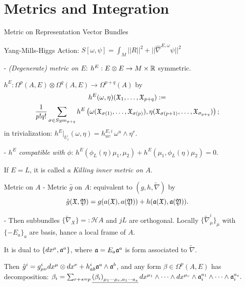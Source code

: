 \section{Metrics and Integration}

\begin{frame}{Metric on Representation Vector Bundles}
    
    Yang-Mills-Higgs Action: $ S[\omega, \psi]=\int_M ||R||^2 + ||\hat \nabla^{E, \omega} \psi||^2$
    
    - \emph{(Degenerate) metric on $E$}: $h^E: E \otimes E \to M \times \mathbb{R}$ symmetric.
    
    $h^E: \Omega^p(A, E) \otimes \Omega^q(A, E) \to \Omega^{p+q}(A)$ by
    \begin{multline*}
        h^E(\omega, \eta)(\mathfrak{X}_1, \dots, \mathfrak{X}_{p+q}) :=\\ \frac{1}{p!q!} \sum_{\sigma \in Sym_{p+q}} 
        h^E\left( \omega(\mathfrak{X}_{\sigma(1)}, \dots, \mathfrak{X}_{\sigma(p)}),  \eta(\mathfrak{X}_{\sigma(p+1)}, \dots, \mathfrak{X}_{\sigma_{p+q}}) \right);
    \end{multline*}
    in trivialization: $h^E|_{U_i}(\omega, \eta) = h^{E,i}_{uv}\,\omega^u \wedge \eta^v$.
    
    - \emph{$h^E$ compatible with $\phi$}: $h^E(\phi_L(\eta) \mu_1, \mu_2) + h^E(\mu_1, \phi_L(\eta)\mu_2) = 0$.
    
    If $E = L$, it is called \emph{a Killing inner metric on $A$}.
\end{frame}



\begin{frame}{Metric on $A$}
    - Metric $\hat g$ on $A$: equivalent to $(g, h, \tilde \nabla)$ by $$\hat g(\mathfrak{X}, \mathfrak{Y}) = g(a(\mathfrak{X}), a(\mathfrak{Y})) + h(\mathfrak{a}(\mathfrak{X}), \mathfrak{a}(\mathfrak{Y})).$$
    
    - Then subbundles $\{\tilde \nabla_X\} =: \mathcal H A$ and $jL$ are orthogonal. Locally $\{\tilde \nabla^i_{\mu}\}_\mu$ with $\{-E_a\}_a$ are basis, hance a local frame of $A$.
    
    It is dual to $\{dx^\mu, \mathfrak{a}^a\}$, where $\mathfrak{a} =  E_a \mathfrak{a}^a$ is form associated to $\tilde \nabla$.
    
    Then $\hat g^i = g^i_{\mu \nu} dx^\mu \otimes dx^\nu + h^i_{ab} \mathfrak{a}^a \wedge \mathfrak{a}^b$, and any form $\beta \in \Omega^p(A, E)$ has decomposition:
    $
    \beta_i = \sum_{r + s = p} \emph{\left(\beta_i \right)_{\mu_1 \cdots \mu_r, a_1 \cdots a_s}} \, dx^{\mu_1} \wedge \cdots \wedge dx^{\mu_r} \wedge \mathfrak{a}_i^{a_1} \wedge \cdots \wedge \mathfrak{a}_i^{a_s}.
    $
    
\end{frame}



